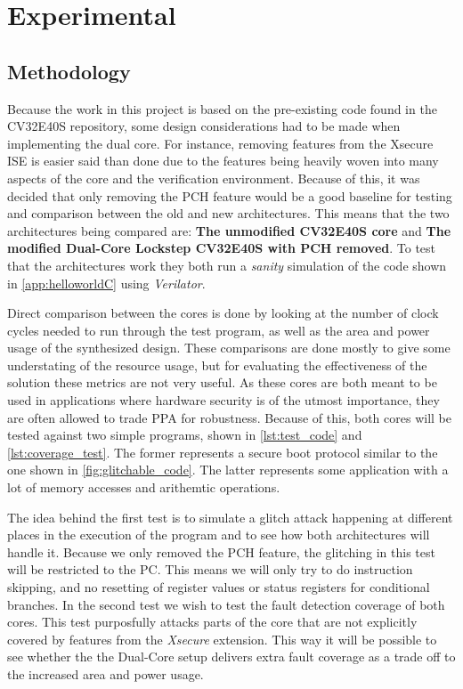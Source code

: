\chapter{Experimental}
\label{chap4}

\section{Methodology}
\label{sec:method}

Because the work in this project is based on the pre-existing code found in the CV32E40S repository\cite{cv32e40s_manual}, some design considerations had to be made when implementing the dual core. For instance, removing features from the Xsecure ISE is easier said than done due to the features being heavily woven into many aspects of the core and the verification environment. Because of this, it was decided that only removing the PCH feature would be a good baseline for testing and comparison between the old and new architectures. This means that the two architectures being compared are: \textbf{The unmodified CV32E40S core} and \textbf{The modified Dual-Core Lockstep CV32E40S with PCH removed}. To test that the architectures work they both run a \textit{sanity} simulation of the code shown in \autoref{app:helloworldC} using \textit{Verilator}\cite{verilator}.

Direct comparison between the cores is done by looking at the number of clock cycles needed to run through the test program, as well as the area and power usage of the synthesized design. These comparisons are done mostly to give some understating of the resource usage, but for evaluating the effectiveness of the solution these metrics are not very useful. As these cores are both meant to be used in applications where hardware security is of the utmost importance, they are often allowed to trade PPA for robustness. Because of this, both cores will be tested against two simple programs, shown in \autoref{lst:test_code} and \autoref{lst:coverage_test}. The former represents a secure boot protocol similar to the one shown in \autoref{fig:glitchable_code}. The latter represents some application with a lot of memory accesses and arithemtic operations. 

The idea behind the first test is to simulate a glitch attack happening at different places in the execution of the program and to see how both architectures will handle it. Because we only removed the PCH feature, the glitching in this test will be restricted to the PC. This means we will only try to do instruction skipping, and no resetting of register values or status registers for conditional branches. In the second test we wish to test the fault detection coverage of both cores. This test purposfully attacks parts of the core that are not explicitly covered by features from the \textit{Xsecure} extension. This way it will be possible to see whether the the Dual-Core setup delivers extra fault coverage as a trade off to the increased area and power usage. 

